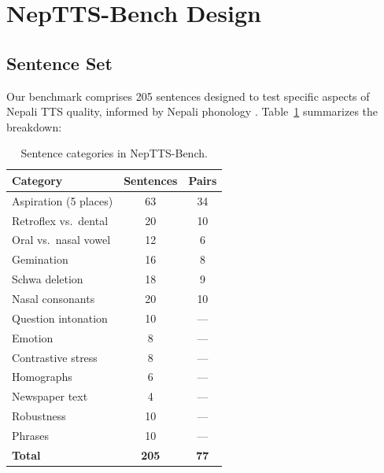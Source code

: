 \documentclass[11pt]{article}
\begin{document}
\section{NepTTS-Bench Design}

\subsection{Sentence Set}

Our benchmark comprises 205 sentences designed to test specific aspects of Nepali TTS quality, informed by Nepali phonology \citep{khatiwada2009, pokharel1989, bandhu1971}. Table~\ref{tab:categories} summarizes the breakdown:

\begin{table}[h]
\centering
\caption{Sentence categories in NepTTS-Bench.}
\label{tab:categories}
\begin{tabular}{lcc}
\toprule
Category & Sentences & Pairs \\
\midrule
Aspiration (5 places) & 63 & 34 \\
Retroflex vs.\ dental & 20 & 10 \\
Oral vs.\ nasal vowel & 12 & 6 \\
Gemination & 16 & 8 \\
Schwa deletion & 18 & 9 \\
Nasal consonants & 20 & 10 \\
Question intonation & 10 & --- \\
Emotion & 8 & --- \\
Contrastive stress & 8 & --- \\
Homographs & 6 & --- \\
Newspaper text & 4 & --- \\
Robustness & 10 & --- \\
Phrases & 10 & --- \\
\midrule
\textbf{Total} & \textbf{205} & \textbf{77} \\
\bottomrule
\end{tabular}
\end{table}
\end{document}

